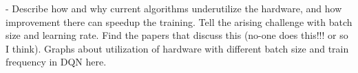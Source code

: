 - Describe how and why current algorithms underutilize the hardware, and how
  improvement there can speedup the training. Tell the arising challenge with
  batch size and learning rate. Find the papers that discuss this (no-one does
  this!!! or so I think). Graphs about utilization of hardware with
  different batch size and train frequency in DQN here.
